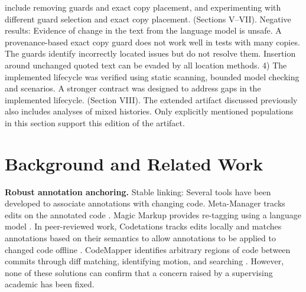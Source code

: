 \documentclass[10pt,conference,letterpaper]{IEEEtran}
\begin{document}
include removing guards and exact copy placement, and experimenting with different guard selection and exact copy placement. (Sections V--VII). Negative results: Evidence of change in the text from the language model is unsafe. A provenance-based exact copy guard does not work well in tests with many copies. The guards identify incorrectly located issues but do not resolve them. Insertion around unchanged quoted text can be evaded by all location methods. 4) The implemented lifecycle was verified using static scanning, bounded model checking and scenarios. A stronger contract was designed to address gaps in the implemented lifecycle. (Section VIII). The extended artifact discussed previously also includes analyses of mixed histories. Only explicitly mentioned populations in this section support this edition of the artifact.








\section{Background and Related Work}

\textbf{Robust annotation anchoring.} Stable linking: Several tools have been developed to associate annotations with changing code. Meta-Manager tracks edits on the annotated code \cite{meta2024}. Magic Markup provides re-tagging using a language model \cite{magic2024}. In peer-reviewed work, Codetations tracks edits locally and matches annotations based on their semantics to allow annotations to be applied to changed code offline \cite{codetations2026}. CodeMapper identifies arbitrary regions of code between commits through diff matching, identifying motion, and searching \cite{codemapper2026}. However, none of these solutions can confirm that a concern raised by a supervising academic has been fixed.
\end{document}
